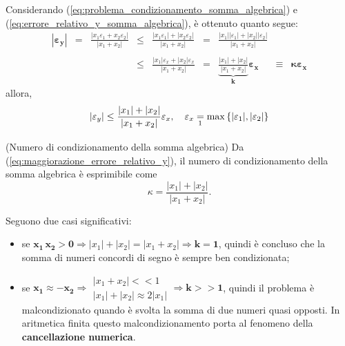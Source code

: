 Considerando (\ref{eq:problema_condizionamento_somma_algebrica}) e (\ref{eq:errore_relativo_y_somma_algebrica}), è ottenuto quanto segue:
\begin{equation}\label{eq:maggiorazione_errore_relativo_y}
	\begin{matrix}
		\boldsymbol{|\varepsilon_y|} &=&\frac{|x_1\varepsilon_1+x_2\varepsilon_2|}{|x_1+x_2|} &\leq& \frac{|x_1\varepsilon_1|+|x_2\varepsilon_2|}{|x_1+x_2|}&=& \frac{|x_1||\varepsilon_1|+|x_2||\varepsilon_2|}{|x_1+x_2|}\\\\
		&& &\leq& \frac{|x_1|\varepsilon_x+|x_2|\varepsilon_x}{|x_1+x_2|} &=& \underbrace{\frac{|x_1|+|x_2|}{|x_1+x_2|}}_{\boldsymbol k}\boldsymbol{\varepsilon_x} &\equiv& \boldsymbol{\kappa\varepsilon_x}
	\end{matrix}
\end{equation}
allora,
\begin{equation*}
	|\varepsilon_y| \leq \frac{|x_1|+|x_2|}{|x_1+x_2|}\varepsilon_x, \quad \varepsilon_x \underset{\footnotemark}{=} \max\left\{|\varepsilon_1|,|\varepsilon_2|\right\}
\end{equation*}

\begin{definition}(Numero di condizionamento della somma algebrica)
	Da (\ref{eq:maggiorazione_errore_relativo_y}), il numero di condizionamento della somma algebrica è esprimibile come
	\begin{equation*}
		\kappa=\frac{|x_1|+|x_2|}{|x_1+x_2|}.
	\end{equation*}	
\end{definition}

Seguono due casi significativi:
\begin{itemize}
	\item se $\boldsymbol{x_1\, x_2>0}\Rightarrow|x_1|+|x_2|=|x_1+x_2|\Rightarrow \boldsymbol{k=1}$, quindi è concluso che la somma di numeri concordi di segno è sempre ben condizionata;
	\item se $\boldsymbol{x_1\approx -x_2}\Rightarrow\begin{matrix}
		|x_1+x_2| << 1\\
		|x_1|+|x_2| \approx 2|x_1|
	\end{matrix}\Rightarrow \boldsymbol{k>>1}$, quindi il problema è malcondizionato quando è svolta la somma di due numeri quasi opposti. In aritmetica finita questo malcondizionamento porta al fenomeno della \textbf{cancellazione numerica}.
\end{itemize}

